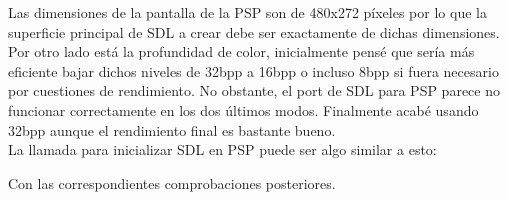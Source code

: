 Las dimensiones de la pantalla de la PSP son de 480x272 píxeles por lo que
la superficie principal de SDL a crear debe ser exactamente de dichas dimensiones.
Por otro lado está la profundidad de color, inicialmente pensé que sería más
eficiente bajar dichos niveles de 32bpp a 16bpp o incluso 8bpp si fuera necesario
por cuestiones de rendimiento. No obstante, el port de SDL para PSP
parece no funcionar correctamente en los dos últimos modos. Finalmente acabé
usando 32bpp aunque el rendimiento final es bastante bueno.\\

La llamada para inicializar SDL en PSP puede ser algo similar a esto:



Con las correspondientes comprobaciones posteriores.

